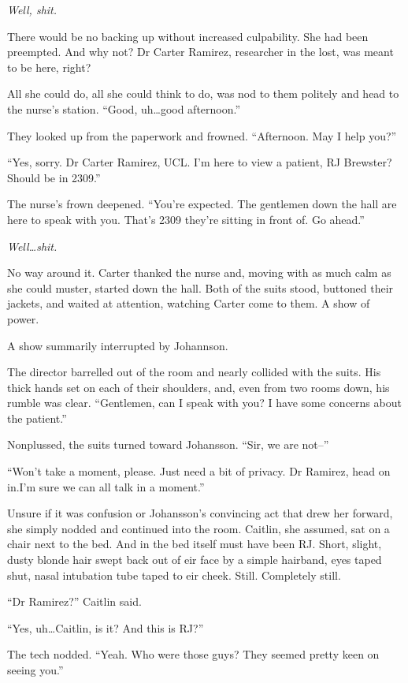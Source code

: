 \emph{Well, shit.}

There would be no backing up without increased culpability. She had been preempted. And why not? Dr Carter Ramirez, researcher in the lost, was meant to be here, right?

All she could do, all she could think to do, was nod to them politely and head to the nurse's station. ``Good, uh\ldots{}good afternoon.''

They looked up from the paperwork and frowned. ``Afternoon. May I help you?''

``Yes, sorry. Dr Carter Ramirez, UCL. I'm here to view a patient, RJ Brewster? Should be in 2309.''

The nurse's frown deepened. ``You're expected. The gentlemen down the hall are here to speak with you. That's 2309 they're sitting in front of. Go ahead.''

\emph{Well\ldots{}shit.}

No way around it. Carter thanked the nurse and, moving with as much calm as she could muster, started down the hall. Both of the suits stood, buttoned their jackets, and waited at attention, watching Carter come to them. A show of power.

A show summarily interrupted by Johannson.

The director barrelled out of the room and nearly collided with the suits. His thick hands set on each of their shoulders, and, even from two rooms down, his rumble was clear. ``Gentlemen, can I speak with you? I have some concerns about the patient.''

Nonplussed, the suits turned toward Johansson. ``Sir, we are not--''

``Won't take a moment, please. Just need a bit of privacy. Dr Ramirez, head on in.I'm sure we can all talk in a moment.''

Unsure if it was confusion or Johansson's convincing act that drew her forward, she simply nodded and continued into the room. Caitlin, she assumed, sat on a chair next to the bed. And in the bed itself must have been RJ. Short, slight, dusty blonde hair swept back out of eir face by a simple hairband, eyes taped shut, nasal intubation tube taped to eir cheek. Still. Completely still.

``Dr Ramirez?'' Caitlin said.

``Yes, uh\ldots{}Caitlin, is it? And this is RJ?''

The tech nodded. ``Yeah. Who were those guys? They seemed pretty keen on seeing you.''

